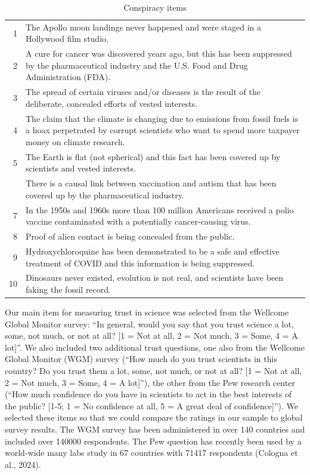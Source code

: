 \documentclass[
  doc,floatsintext]{apa6}
\begin{document}
\begin{longtable}[t]{>{}r>{\raggedright\arraybackslash}p{40em}}
\caption{\label{tab:conspiracy}Conspiracy items}\\
\toprule
1 & The Apollo moon landings never happened and were staged in a Hollywood film studio.\\
2 & A cure for cancer was discovered years ago, but this has been suppressed by the pharmaceutical industry and the U.S. Food and Drug Administration (FDA).\\
3 & The spread of certain viruses and/or diseases is the result of the deliberate, concealed efforts of vested interests.\\
4 & The claim that the climate is changing due to emissions from fossil fuels is a hoax perpetrated by corrupt scientists who want to spend more taxpayer money on climate research.\\
5 & The Earth is flat (not spherical) and this fact has been covered up by scientists and vested interests.\\
\addlinespace
6 & There is a causal link between vaccination and autism that has been covered up by the pharmaceutical industry.\\
7 & In the 1950s and 1960s more than 100 million Americans received a polio vaccine contaminated with a potentially cancer-causing virus.\\
8 & Proof of alien contact is being concealed from the public.\\
9 & Hydroxychloroquine has been demonstrated to be a safe and effective treatment of COVID and this information is being suppressed.\\
10 & Dinosaurs never existed, evolution is not real, and scientists have been faking the fossil record.\\
\bottomrule
\end{longtable}
\endgroup{}

Our main item for measuring trust in science was selected from the Wellcome Global Monitor survey: ``In general, would you say that you trust science a lot, some, not much, or not at all? {[}1 = Not at all, 2 = Not much, 3 = Some, 4 = A lot{]}''. We also included two additional trust questions, one also from the Wellcome Global Monitor (WGM) survey (``How much do you trust scientists in this country? Do you trust them a lot, some, not much, or not at all? {[}1 = Not at all, 2 = Not much, 3 = Some, 4 = A lot{]}''), the other from the Pew research center (``How much confidence do you have in scientists to act in the best interests of the public? {[}1-5; 1 = No confidence at all, 5 = A great deal of confidence{]}''). We selected these items so that we could compare the ratings in our sample to global survey results. The WGM survey has been administered in over 140 countries and included over 140000 respondents. The Pew question has recently been used by a world-wide many labs study in 67 countries with 71417 respondents (Cologna et al., 2024).
\end{document}
